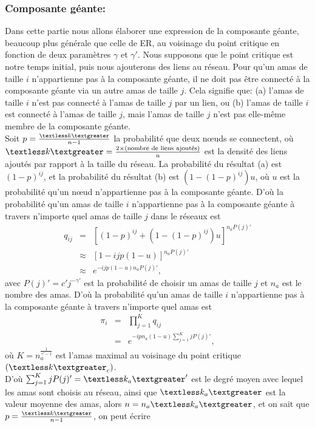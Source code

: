 \subsubsection{Composante géante:}
Dans cette partie nous allons élaborer une expression de la composante géante, beaucoup plus générale que celle de ER, au voisinage du point critique en fonction de deux paramètres $\gamma$ et $\gamma'$.
Nous supposons que le point critique est notre temps initial, puis nous ajouterons des liens au réseau.
Pour qu'un amas de taille $i$ n'appartienne pas à la composante géante, il ne doit pas être connecté à la composante géante via un autre amas de taille $j$. Cela signifie que: (a) l'amas de taille $i$ n'est pas connecté à l'amas de taille $j$ par un lien, ou (b) l'amas  de taille $i$ est connecté à l'amas de taille $j$, mais l'amas de taille $j$ n'est pas elle-même membre de la composante géante.\\
Soit $p=\frac{\km}{n-1}$ la probabilité que deux nœuds se connectent, où 
$\km=\frac{2\times\text{(nombre de liens ajoutés)}}{\text{n}}$ est la densité des liens ajoutés par rapport à la taille du réseau.
La probabilité du résultat (a) est $(1-p)^{ij}$, et la probabilité du résultat (b) est $(1-(1-p)^{ij})u$, où $u$ est la probabilité qu'un nœud n'appartienne pas à la composante géante. D'où la probabilité qu'un amas de taille $i$ n'appartienne pas à la composante géante à travers n'importe quel amas de taille $j$  dans le réseaux est
\begin{eqnarray}
q_{ij}&=&[(1-p)^{ij}+(1-(1-p)^{ij})u]^{n_aP(j)'}\nonumber\\
&\approx&[1-ijp(1-u)]^{n_aP(j)'}\nonumber\\
&\approx&e^{-ijp(1-u)n_aP(j)'},
\end{eqnarray}
 avec $P(j)'=c'j^{-\gamma'}$ est la probabilité de choisir un amas de taille $j$ et $n_a$ est le nombre des amas.
D'où la probabilité qu'un amas de taille $i$ n'appartienne pas à la composante géante à travers n'importe quel amas est
\begin{eqnarray}
\pi_{i}&=&\prod_{j=1}^{K}q_{ij}\nonumber\\
       &=&e^{-ipn_a(1-u)\sum_{j=1}^{K}jP(j)'},
\end{eqnarray}
où $K=n_a^{\frac{1}{\gamma'-1}}$ est l'amas maximal au voisinage du point critique $(\km_c)$.\\ D'où $\sum_{j=1}^{K}jP(j)'=\kma'$ est le degré moyen avec lequel les amas sont choisis au réseau, ainsi que $\kma$ est la valeur moyenne des amas, alors $n=n_a\kma$, et on sait que $p=\frac{\km}{n-1}$, on peut écrire

